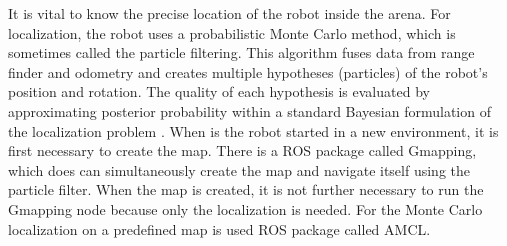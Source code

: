 It is vital to know the precise location of the robot inside the arena. For localization, the robot uses a probabilistic Monte Carlo method, which is sometimes called the particle filtering. This algorithm fuses data from range finder and odometry and creates multiple hypotheses (particles) of the robot's position and rotation. The quality of each hypothesis is evaluated by approximating posterior probability within a standard Bayesian formulation of the localization problem \cite{dellaert1999} \cite{thrun2000}. When is the robot started in a new environment, it is first necessary to create the map. There is a ROS package called Gmapping, which does can simultaneously create the map and navigate itself using the particle filter. When the map is created, it is not further necessary to run the Gmapping node because only the localization is needed. For the Monte Carlo localization on a predefined map is used ROS package called AMCL.

\newpage